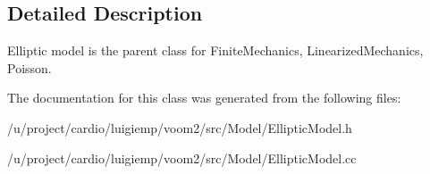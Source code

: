 \subsection{Detailed Description}
Elliptic model is the parent class for FiniteMechanics, LinearizedMechanics, Poisson. 

The documentation for this class was generated from the following files:\begin{DoxyCompactItemize}
\item 
/u/project/cardio/luigiemp/voom2/src/Model/EllipticModel.h\item 
/u/project/cardio/luigiemp/voom2/src/Model/EllipticModel.cc\end{DoxyCompactItemize}

